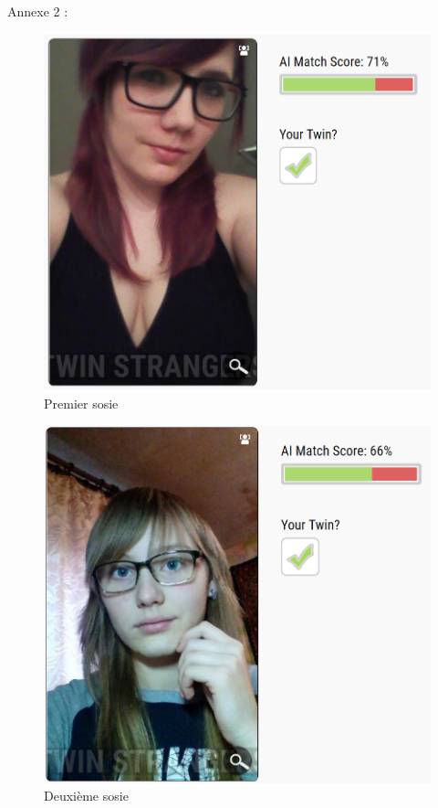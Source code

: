 \documentclass[a4paper,12pt]{article}
\begin{document}
Annexe 2 : 
\begin{figure}[!h]
    \centering
        \includegraphics[scale=0.45]{images/ResS1.PNG}
        \caption{Premier sosie}
    \end{figure}
    \begin{figure}[!h]
    \centering
        \includegraphics[scale=0.3]{images/ResS12.PNG}
        \caption{Deuxième sosie}
    \end{figure}
\end{document}
